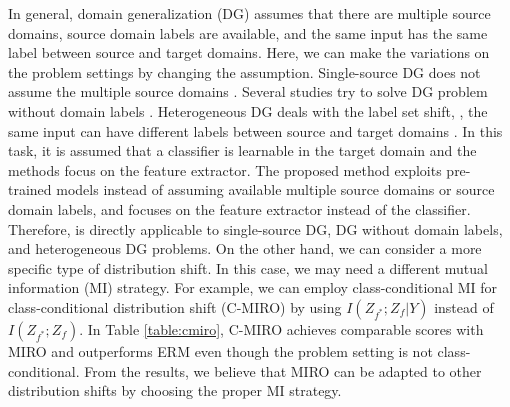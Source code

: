 
In general, domain generalization (DG) assumes that there are multiple source domains, source domain labels are available, and the same input has the same label between source and target domains. Here, we can make the variations on the problem settings by changing the assumption. Single-source DG does not assume the multiple source domains \cite{cha2021swad,fan2021adversarially_single_dg}. Several studies try to solve DG problem without domain labels \cite{carlucci2019jigsaw_jigen,cha2021swad,matsuura2020aaai_mixture_mld}. Heterogeneous DG deals with the label set shift, \ie, the same input can have different labels between source and target domains \cite{li2019heteroDG,wang2020interdomain_mixup_icassp_dg}. In this task, it is assumed that a classifier is learnable in the target domain and the methods focus on the feature extractor. The proposed method exploits pre-trained models instead of assuming available multiple source domains or source domain labels, and focuses on the feature extractor instead of the classifier. Therefore, \method{} is directly applicable to single-source DG, DG without domain labels, and heterogeneous DG problems.
On the other hand, we can consider a more specific type of distribution shift. In this case, we may need a different mutual information (MI) strategy. For example, we can employ class-conditional MI for class-conditional distribution shift (C-MIRO) by using $I(Z_{f^*};Z_f|Y)$ instead of $I(Z_{f^*}; Z_f)$.
In Table \ref{table:cmiro}, C-MIRO achieves comparable scores with MIRO and outperforms ERM even though the problem setting is not class-conditional. From the results, we believe that MIRO can be adapted to other distribution shifts by choosing the proper MI strategy.


